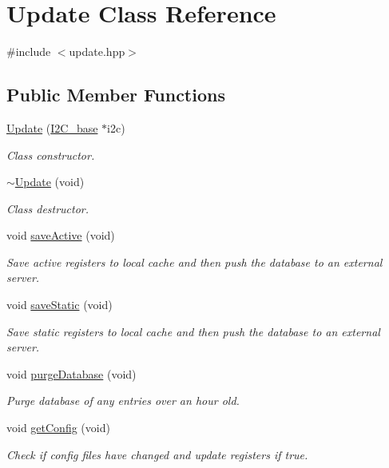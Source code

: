\hypertarget{class_update}{}\section{Update Class Reference}
\label{class_update}


{\ttfamily \#include $<$update.\+hpp$>$}

\subsection*{Public Member Functions}
\begin{DoxyCompactItemize}
\item 
\hyperlink{class_update_ae98127672846c7c6830dfeb912d92bbd}{Update} (\hyperlink{class_i2_c__base}{I2\+C\+\_\+base} $\ast$i2c)
\begin{DoxyCompactList}\small\item\em Class constructor. \end{DoxyCompactList}\item 
\hyperlink{class_update_a60ebd12d7fa5522051224aafabbcd173}{$\sim$\+Update} (void)
\begin{DoxyCompactList}\small\item\em Class destructor. \end{DoxyCompactList}\item 
void \hyperlink{class_update_abe8da9ed1741071632333a18f6ab8a8e}{save\+Active} (void)
\begin{DoxyCompactList}\small\item\em Save active registers to local cache and then push the database to an external server. \end{DoxyCompactList}\item 
void \hyperlink{class_update_a2862a009b663402e8f61909ee1dbfd73}{save\+Static} (void)
\begin{DoxyCompactList}\small\item\em Save static registers to local cache and then push the database to an external server. \end{DoxyCompactList}\item 
void \hyperlink{class_update_a9303c4c10cdf05f46d023d15c3ccdf65}{purge\+Database} (void)
\begin{DoxyCompactList}\small\item\em Purge database of any entries over an hour old. \end{DoxyCompactList}\item 
void \hyperlink{class_update_acd57a3baaababf08fea4f9c1026d5ed2}{get\+Config} (void)
\begin{DoxyCompactList}\small\item\em Check if config files have changed and update registers if true. \end{DoxyCompactList}\end{DoxyCompactItemize}


